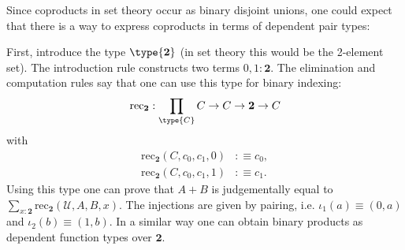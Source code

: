 
    Since coproducts in set theory occur as binary disjoint unions, one could expect that there is a way to express coproducts in terms of dependent pair types:
    \begin{construct}
        First, introduce the type $\type{\mathbf{2}}$ (in set theory this would be the 2-element set). The introduction rule constructs two terms $0,1:\mathbf{2}$. The elimination and computation rules say that one can use this type for binary indexing:
        \begin{gather}
            \text{rec}_{\mathbf{2}}:\prod_{\type{C}}C\rightarrow C\rightarrow\mathbf{2}\rightarrow C
        \end{gather}
        with
        \begin{align}
            \text{rec}_{\mathbf{2}}(C, c_0, c_1, 0)&:\equiv c_0,\\
            \text{rec}_{\mathbf{2}}(C, c_0, c_1, 1)&:\equiv c_1.
        \end{align}
        Using this type one can prove that $A+B$ is judgementally equal to $\sum_{x:\mathbf{2}}\text{rec}_{\mathbf{2}}(\mathcal{U},A,B,x)$. The injections are given by pairing, i.e. $\iota_1(a)\equiv(0,a)$ and $\iota_2(b)\equiv(1,b)$. In a similar way one can obtain binary products as dependent function types over $\mathbf{2}$.
    \end{construct}

